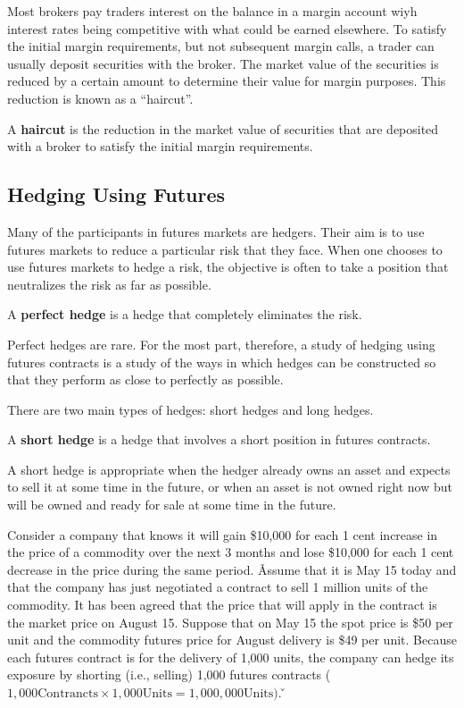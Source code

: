 Most brokers pay traders interest on the balance in a margin account wiyh interest rates being competitive with what
could be earned elsewhere. To satisfy the initial margin requirements, but not subsequent margin calls, a trader can
usually deposit securities with the broker. The market value of the securities is reduced by a certain amount to
determine their value for margin purposes. This reduction is known as a ``haircut''.

\bd[Haircut]
A \textbf{haircut} is the reduction in the market value of securities that are deposited with a broker to satisfy the
initial margin requirements.
\ed

\subsection{Hedging Using Futures}

Many of the participants in futures markets are hedgers. Their aim is to use futures markets to reduce a particular
risk that they face. When one chooses to use futures markets to hedge a risk, the objective is often to take a
position that neutralizes the risk as far as possible.

A \textbf{perfect hedge} is a hedge that completely eliminates the risk.
\ed

Perfect hedges are rare. For the most part, therefore, a study of hedging using futures contracts is a study of the
ways in which hedges can be constructed so that they perform as close to perfectly as possible.

There are two main types of hedges: short hedges and long hedges.

A \textbf{short hedge} is a hedge that involves a short position in futures contracts.
\ed

A short hedge is appropriate when the hedger already owns an asset and expects to sell it at some time in the
future, or when an asset is not owned right now but will be owned and ready for sale at some time in the future.

\be
Consider a company that knows it will gain \$10,000 for each 1 cent increase in the price of a commodity over the next
3 months and lose \$10,000 for each 1 cent decrease in the price during the same period. \v

Assume that it is May 15 today and that the company has just negotiated a contract to sell 1 million units of the
commodity. It has been agreed that the price that will apply in the contract is the market price on August 15.
Suppose that on May 15 the spot price is \$50 per unit and the commodity futures price for August delivery is \$49 per
unit. Because each futures contract is for the delivery of 1,000 units, the company can hedge its exposure by
shorting (i.e., selling) 1,000 futures contracts ($1,000 \text{Contrancts} \times 1,000 \text{Units} = 1,000,000
\text{Units})$. \v

